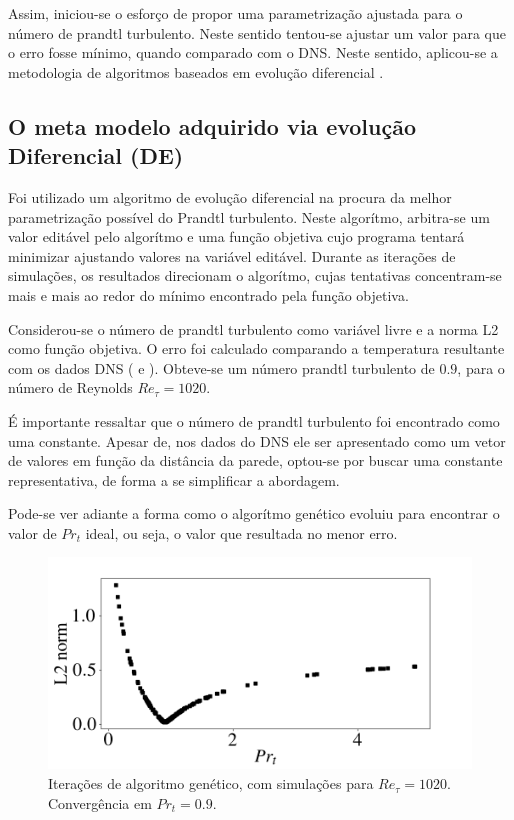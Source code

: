 Assim, iniciou-se o esforço de propor uma parametrização ajustada para o número de prandtl turbulento. Neste sentido tentou-se ajustar um valor para que o erro fosse mínimo, quando comparado com o DNS. Neste sentido, aplicou-se a metodologia de algoritmos baseados em evolução diferencial \cite{Price2013}.

\subsection{O meta modelo adquirido via evolução Diferencial (DE)}

Foi utilizado um algoritmo de evolução diferencial \cite{diferential} na procura da melhor parametrização possível do Prandtl turbulento. Neste algorítmo, arbitra-se um valor editável pelo algorítmo e uma função objetiva cujo programa tentará minimizar ajustando valores na variável editável. Durante as iterações de simulações, os resultados direcionam o algorítmo, cujas tentativas concentram-se mais e mais ao redor do mínimo encontrado pela função objetiva.

Considerou-se o número de prandtl turbulento como variável livre e a norma L2 como função objetiva.
O erro foi calculado comparando a temperatura resultante com os dados DNS (\cite{dns1020} e \cite{dns150}). Obteve-se um número prandtl turbulento de $ 0.9$, para o número de Reynolds $ Re_\tau = 1020$.

É importante ressaltar que o número de prandtl turbulento foi encontrado como uma constante. Apesar de, nos dados do DNS ele ser apresentado como um vetor de valores em função da distância da parede, optou-se por buscar uma constante representativa, de forma a se simplificar a abordagem.



Pode-se ver adiante a forma como o algorítmo genético evoluiu para encontrar o valor de $ Pr_t $ ideal, ou seja, o valor que resultada no menor erro.

\begin{figure}[!h]
	\centering
	\includegraphics[angle=0, scale=0.61]{fotos_formatacao_final/Genetic_amostra}
	\caption{Iterações de algoritmo genético, com simulações para $Re_\tau = 1020$. Convergência em $Pr_t = 0.9 $.}
\end{figure}

